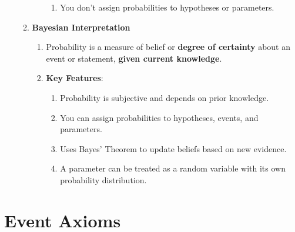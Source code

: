 \begin{enumerate}
\begin{enumerate}
\begin{enumerate}
\begin{enumerate}
                \item You don’t assign probabilities to hypotheses or parameters.
            \end{enumerate}
        \end{enumerate}

        \item \textbf{Bayesian Interpretation}
        \begin{enumerate}
            \item Probability is a measure of belief or \textbf{degree of certainty} about an event or statement, \textbf{given current knowledge}.

            \item \textbf{Key Features}:
            \begin{enumerate}
                \item Probability is subjective and depends on prior knowledge.
                \item You can assign probabilities to hypotheses, events, and parameters.
                \item Uses Bayes' Theorem to update beliefs based on new evidence.
                \item A parameter can be treated as a random variable with its own probability distribution.
            \end{enumerate}
        \end{enumerate}
    \end{enumerate}
\end{enumerate}


\section{Event Axioms}

